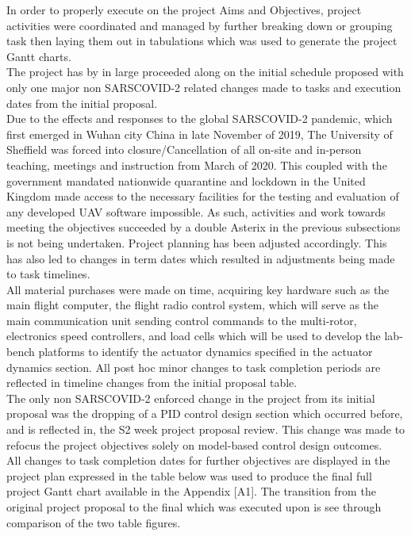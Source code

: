 \documentclass[12pt,a4paper,twoside]{report}
\begin{document}
			In order to properly execute on the project Aims and Objectives, project activities were coordinated and managed by further breaking down or grouping task then laying them out in tabulations which was used to generate the project Gantt charts.
			\\
			The project has by in large proceeded along on the initial schedule proposed with only one major non SARSCOVID-2 related changes made to tasks and execution dates from the initial proposal. 
			\\
			Due to the effects and responses to the global SARSCOVID-2 pandemic, which first emerged in Wuhan city China in late November of 2019, The University of Sheffield was forced into closure/Cancellation of all on-site and in-person teaching, meetings and instruction from March of 2020. This coupled with the government mandated nationwide quarantine and lockdown in the United Kingdom made access to the necessary facilities for the testing and evaluation of any developed UAV software impossible. As such, activities and work towards meeting the objectives succeeded by a double Asterix in the previous subsections is not being undertaken. Project planning has been adjusted accordingly. This has also led to changes in term dates which resulted in adjustments being made to task timelines.
			\\
			All material purchases were made on time, acquiring key hardware such as the main flight computer, the flight radio control system, which will serve as the main communication unit sending control commands to the multi-rotor, electronics speed controllers, and load cells which will be used to develop the lab-bench platforms to identify the actuator dynamics specified in the actuator dynamics section. All post hoc minor changes to task completion periods are reflected in timeline changes from the initial proposal table. 
			\\
			The only non SARSCOVID-2 enforced change in the project from its initial proposal was the dropping of a PID control design section which occurred before, and is reflected in, the S2 week project proposal review. This change was made to refocus the project objectives solely on model-based control design outcomes.
			\\ 
			All changes to task completion dates for further objectives are displayed in the project plan expressed in the table below was used to produce the final full project Gantt chart available in the Appendix [A1]. The transition from the original project proposal to the final which was executed upon is see through comparison of the two table figures.
			
\end{document}
